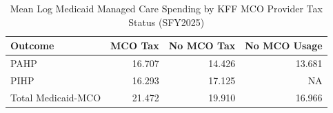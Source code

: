 \begin{table}[!h]
\centering
\caption{Mean Log Medicaid Managed Care Spending by KFF MCO Provider Tax Status (SFY2025)}
\centering
\begin{tabular}[t]{lrrr}
\toprule
Outcome & MCO Tax & No MCO Tax & No MCO Usage\\
\midrule
PAHP & 16.707 & 14.426 & 13.681\\
PIHP & 16.293 & 17.125 & NA\\
Total Medicaid-MCO & 21.472 & 19.910 & 16.966\\
\bottomrule
\end{tabular}
\end{table}
